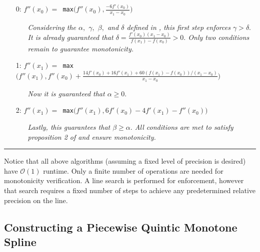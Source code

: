 \documentclass{scspaperproc}
\theoremstyle{scsthe}
\begin{document}
\begin{itemize}
  \itemsep0pt
  \parskip0pt

\item[0:] $f''(x_0) = $\texttt{ max}$\bigg(f''(x_0), \frac{-6 f'(x_0)}{x_1 - x_0}\bigg)$

  \begin{itemize}
    \item[] \textit{Considering the $\alpha,$ $\gamma,$ $\beta,$ and $\delta$ defined in \cite{schmidt1988positivity}, this first step enforces $\gamma > \delta.$ It is already guaranteed that $\delta = \frac{f'(x_0)(x_1 - x_0)}{f(x_1) - f(x_0)} > 0.$ Only two conditions remain to guarantee monotonicity.}
  \end{itemize}

\item[1:] $f''(x_1) = $\texttt{ max}$\bigg( f''(x_1), f''(x_0) + \frac{14 f'(x_0) + 16 f'(x_1) + 60(f(x_1) - f(x_0)) / (x_1 - x_0)}{x_1 - x_0} \bigg)$

  \begin{itemize}
    \item[] \textit{Now it is guaranteed that $\alpha \geq 0.$}
  \end{itemize}

\item[2:] $f''(x_1) = $\texttt{ max}$\bigg( f''(x_1), 6 f'(x_0) - 4 f'(x_1) - f''(x_0) \bigg)$

  \begin{itemize}
    \item[] \textit{Lastly, this guarantees that $\beta \geq \alpha.$ All conditions are met to satisfy proposition 2 of \cite{schmidt1988positivity} and ensure monotonicity.}
  \end{itemize}
\end{itemize}
\hrule
\vspace{10pt}
Notice that all above algorithms (assuming a fixed level of precision is desired) have $\mathcal{O}(1)$ runtime. Only a finite number of operations are needed for monotonicity verification. A line search is performed for enforcement, however that search requires a fixed number of steps to achieve any predetermined relative precision on the line.


\subsection{Constructing a Piecewise Quintic Monotone Spline}
\label{monotone_spline}
\end{document}
